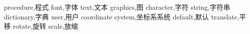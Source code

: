 
procedure,程式
font,字体
text,文本
graphics,图
character,字符
string,字符串
dictionary,字典
user,用户
coordinate system,坐标系系统
default,默认
translate,平移
rotate,旋转
scale,放缩
